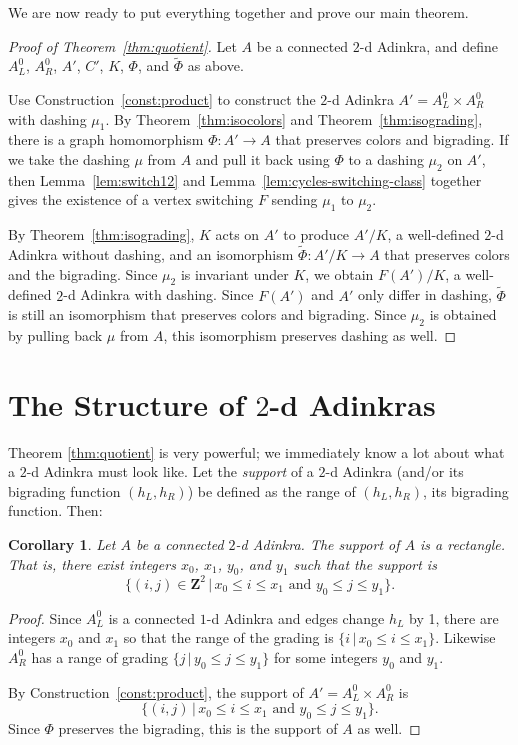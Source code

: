 \documentclass[12pt,twoside,singlespace]{article}
\numberwithin{equation}{section}
\newtheorem{cor}[equation]{Corollary}
\theoremstyle{definition}
\newcommand{\ZZ}{\mathbf{Z}}
\begin{document}
We are now ready to put everything together and prove our main theorem.

\begin{proof}[Proof of Theorem~\ref{thm:quotient}]
Let $A$ be a connected $2$-d Adinkra, and define $A_L^0$, $A_R^0$, $A'$, $C'$, $K$, $\Phi$, and $\tilde{\Phi}$ as above.

Use Construction~\ref{const:product} to construct the $2$-d Adinkra $A'=A_L^0\times A_R^0$ with dashing $\mu_1$.
By Theorem~\ref{thm:isocolors} and Theorem~\ref{thm:isograding}, there is a graph homomorphism $\Phi:A' \to A$ that preserves colors and bigrading.  If we take the dashing $\mu$ from $A$ and pull it back using $\Phi$ to a dashing $\mu_2$ on $A'$, then Lemma~\ref{lem:switch12} and Lemma~\ref{lem:cycles-switching-class} together gives the existence of a vertex switching $F$ sending $\mu_1$ to $\mu_2$.

By Theorem~\ref{thm:isograding}, $K$ acts on $A'$ to produce $A'/K$, a well-defined $2$-d Adinkra without dashing, and an isomorphism $\tilde{\Phi}:A'/K\to A$ that preserves colors and the bigrading.  Since $\mu_2$ is invariant under $K$, we obtain  $F(A')/K$, a well-defined $2$-d Adinkra with dashing. Since $F(A')$ and $A'$ only differ in dashing, $\tilde{\Phi}$ is still an isomorphism that preserves colors and bigrading.  Since $\mu_2$ is obtained by pulling back $\mu$ from $A$, this isomorphism preserves dashing as well.
\end{proof}

\section{The Structure of $2$-d Adinkras}
\label{sec:structure}
Theorem \ref{thm:quotient} is very powerful; we immediately know a lot about what a $2$-d Adinkra must look like. Let the \emph{support} of a $2$-d Adinkra (and/or its bigrading function $(h_L,h_R)$) be defined as the range of $(h_L,h_R)$, its bigrading function. Then:
\begin{cor}
\label{cor:rectangle}
Let $A$ be a connected $2$-d Adinkra.  The support of $A$ is a rectangle.  That is, there exist integers $x_0$, $x_1$, $y_0$, and $y_1$ such that the support is
\[\{(i,j)\in\ZZ^2\,|\,x_0 \le i\le x_1\mbox{ and }y_0\le j\le y_1\}.\]
\end{cor}
\begin{proof}
Since $A_L^0$ is a connected $1$-d Adinkra and edges change $h_L$ by 1, there are integers $x_0$ and $x_1$ so that the range of the grading is $\{i\,|\,x_0\le i\le x_1\}$.  Likewise $A_R^0$ has a range of grading $\{j\,|\,y_0\le j\le y_1\}$ for some integers $y_0$ and $y_1$.

By Construction~\ref{const:product}, the support of $A'=A_L^0\times A_R^0$ is
\[\{(i,j)\,|\,x_0\le i\le x_1\mbox{ and }y_0\le j\le y_1\}.\]
Since $\Phi$ preserves the bigrading, this is the support of $A$ as well.
\end{proof}
\end{document}
